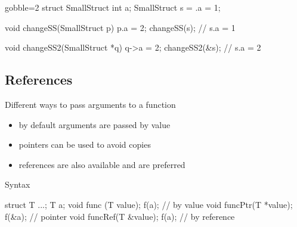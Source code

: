 \begin{frame}[fragile]
  \begin{multicols}{2}
    \begin{cppcode*}{gobble=2}
      struct SmallStruct {int a};
      SmallStruct s = {.a = 1};
      
      void changeSS(SmallStruct p) {
        p.a = 2;
      }
      changeSS(s);
      // s.a = 1
      
      void changeSS2(SmallStruct *q) {
        q->a = 2;
      }
      changeSS2(&s);
      // s.a = 2
    \end{cppcode*}
    \columnbreak
    \null \vfill
    \vfill \null
  \end{multicols}
\end{frame}

\subsection[Refs]{References}

\begin{frame}[fragile]
  \begin{block}{Different ways to pass arguments to a function}
    \begin{itemize}
    \item by default arguments are passed by value
    \item pointers can be used to avoid copies
    \item references are also available and are preferred
    \end{itemize}
  \end{block}
  \pause
  \begin{block}{Syntax}
    \begin{cppcode}
      struct T {...}; T a;
      void func   (T value); f(a);   // by value
      void funcPtr(T *value); f(&a); // pointer
      void funcRef(T &value); f(a);  // by reference
    \end{cppcode}
  \end{block}
\end{frame}


